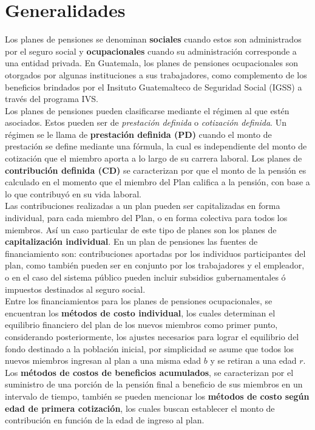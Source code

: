 \documentclass[12pt,letterpaper,titlepage]{article}
\begin{document}
{%
\newpage
\section{Generalidades}
Los planes de pensiones se denominan \textbf{sociales} cuando estos son administrados por el seguro social y \textbf{ocupacionales} cuando su administración corresponde a una entidad privada.  En Guatemala, los planes de pensiones ocupacionales son otorgados por algunas instituciones a sus trabajadores, como complemento de los beneficios brindados por el Insituto Guatemalteco de Seguridad Social (IGSS) a través del programa IVS. \\

Los planes de pensiones pueden clasificarse mediante el régimen al que estén asociados. Estos pueden ser de \textit{prestación definida} o \textit{cotización definida}. Un régimen se le llama de \textbf{prestación definida (PD)} cuando el monto de prestación se define mediante una fórmula, la cual es independiente del monto de cotización que el miembro aporta a lo largo de su carrera laboral. Los planes de \textbf{contribución definida (CD)} se caracterizan por que el monto de la pensión es calculado en el momento que el miembro del Plan califica a la pensión, con base a lo que contribuyó en su vida laboral. \\

Las contribuciones realizadas a un plan pueden ser capitalizadas en forma individual, para  cada miembro del Plan, o en forma colectiva para todos los miembros. Así un caso particular de este tipo de planes son los planes de \textbf{capitalización individual}. En un plan de pensiones las fuentes de financiamiento son:  contribuciones aportadas por los individuos participantes del plan, como también pueden ser en conjunto por los trabajadores y el empleador, o en el caso del sistema público pueden incluir subsidios gubernamentales ó impuestos destinados al seguro social.\\


Entre los financiamientos para los planes de pensiones ocupacionales, se encuentran los \textbf{métodos de costo individual}, los cuales determinan el equilibrio financiero del plan de los nuevos miembros como primer punto, considerando posteriormente, los ajustes necesarios para lograr el equilibrio del fondo destinado a la población inicial, por simplicidad se asume que todos los nuevos miembros ingresan al plan a una misma edad $b$ y se retiran a una edad $r$. Los \textbf{métodos de costos de beneficios acumulados}, se caracterizan por el suministro de una porción de la pensión final a beneficio de sus miembros en un intervalo de tiempo, también se pueden mencionar los \textbf{métodos de costo según edad de primera cotización}, los cuales buscan establecer el monto de contribución en función de la edad de ingreso al plan.\\
 

}
\end{document}
